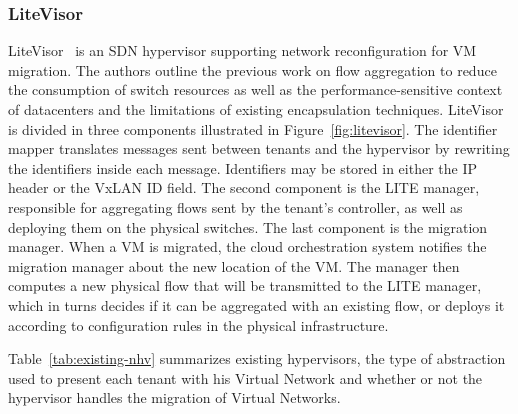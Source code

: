 \subsubsection{LiteVisor}
LiteVisor~\cite{Litevisor-Yang2018} is an SDN hypervisor supporting network reconfiguration for VM migration.
The authors outline the previous work on flow aggregation to reduce the consumption of switch resources as well as the performance-sensitive context of datacenters and the limitations of existing encapsulation techniques.
LiteVisor is divided in three components illustrated in Figure~\ref{fig:litevisor}. The identifier mapper translates messages sent between tenants and the hypervisor by rewriting the identifiers inside each message. Identifiers may be stored in either the IP header or the VxLAN ID field.
The second component is the LITE manager, responsible for aggregating flows sent by the tenant's controller, as well as deploying them on the physical switches. 
The last component is the migration manager. When a VM is migrated, the cloud orchestration system notifies the migration manager about the new location of the VM. The manager then computes a new physical flow that will be transmitted to the LITE manager, which in turns decides if it can be aggregated with an existing flow, or deploys it according to configuration rules in the physical infrastructure.




Table~\ref{tab:existing-nhv} summarizes existing hypervisors, the type of abstraction used to present each tenant with his Virtual Network and whether or not the hypervisor handles the migration of Virtual Networks.
